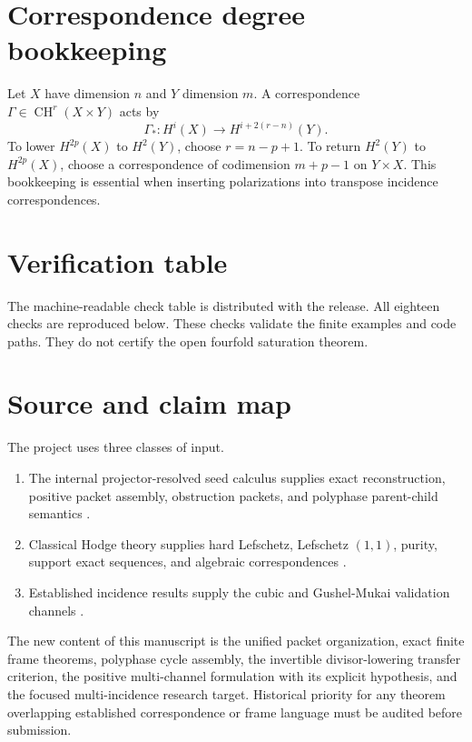 \documentclass[11pt,oneside]{book}
\theoremstyle{definition}
\theoremstyle{remark}
\newcommand{\CH}{\operatorname{CH}}
\begin{document}
\chapter{Correspondence degree bookkeeping}
Let $X$ have dimension $n$ and $Y$ dimension $m$. A correspondence $\Gamma\in\CH^r(X\times Y)$ acts by
\[
\Gamma_*:H^i(X)\to H^{i+2(r-n)}(Y).
\]
To lower $H^{2p}(X)$ to $H^2(Y)$, choose $r=n-p+1$. To return $H^2(Y)$ to $H^{2p}(X)$, choose a correspondence of codimension $m+p-1$ on $Y\times X$. This bookkeeping is essential when inserting polarizations into transpose incidence correspondences.

\chapter{Verification table}
The machine-readable check table is distributed with the release. All eighteen checks are reproduced below. These checks validate the finite examples and code paths. They do not certify the open fourfold saturation theorem.


\chapter{Source and claim map}
The project uses three classes of input.
\begin{enumerate}
\item The internal projector-resolved seed calculus supplies exact reconstruction, positive packet assembly, obstruction packets, and polyphase parent-child semantics \cite{SeedI,SeedII,SeedIII}.
\item Classical Hodge theory supplies hard Lefschetz, Lefschetz $(1,1)$, purity, support exact sequences, and algebraic correspondences \cite{VoisinHodge,ClayHodge}.
\item Established incidence results supply the cubic and Gushel-Mukai validation channels \cite{BeauvilleDonagi,DebarreKuznetsov}.
\end{enumerate}
The new content of this manuscript is the unified packet organization, exact finite frame theorems, polyphase cycle assembly, the invertible divisor-lowering transfer criterion, the positive multi-channel formulation with its explicit hypothesis, and the focused multi-incidence research target. Historical priority for any theorem overlapping established correspondence or frame language must be audited before submission.

\backmatter
\end{document}
